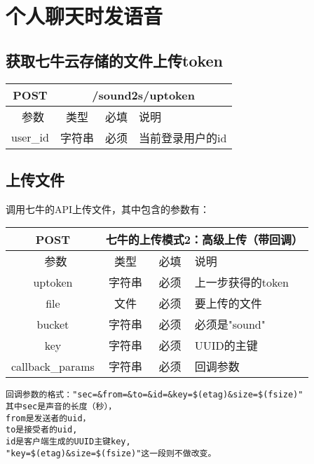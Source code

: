 
\section{个人聊天时发语音}

\subsection{获取七牛云存储的文件上传token}

\begin{table}[H]
   \begin{center}
\begin{tabular}{|c|c|c|p{12cm}|}
\hline
POST & \multicolumn{3}{|c|}{/sound2s/uptoken} \\
\hline\hline
 \  参数  & 类型 & 必填 &  说明  \\
\hline
 user\_id  & 字符串 & 必须 &  当前登录用户的id\\
 \hline
\end{tabular}
   \end{center}
\end{table}


\subsection{上传文件}

调用七牛的API上传文件，其中包含的参数有：

\begin{table}[H]
   \begin{center}
\begin{tabular}{|c|c|c|p{12cm}|}
\hline
POST & \multicolumn{3}{|c|}{七牛的上传模式2：高级上传（带回调）} \\
\hline\hline
 \  参数  & 类型 & 必填 &  说明  \\
\hline
 uptoken  & 字符串 & 必须 &  上一步获得的token\\
 \hline
 file  & 文件 & 必须 &  要上传的文件\\
 \hline
 bucket  & 字符串 & 必须 & 必须是"sound"\\
 \hline
 key  & 字符串 & 必须 &  UUID的主键\\
  \hline
 callback\_params  & 字符串 & 必须 &  回调参数\\
 \hline    
\end{tabular}
   \end{center}
\end{table}

\begin{verbatim}
回调参数的格式："sec=&from=&to=&id=&key=$(etag)&size=$(fsize)"
其中sec是声音的长度（秒），
from是发送者的uid，
to是接受者的uid,
id是客户端生成的UUID主键key,
"key=$(etag)&size=$(fsize)"这一段则不做改变。


\end{verbatim}

